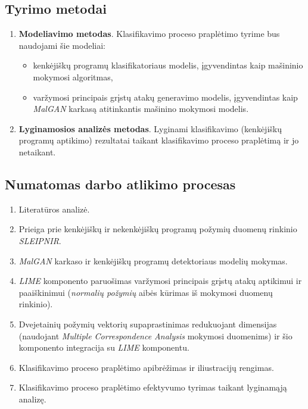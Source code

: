 \pagebreak
\subsection{Tyrimo metodai}

\begin{enumerate}
    \item \textbf{Modeliavimo metodas}. Klasifikavimo proceso praplėtimo tyrime bus naudojami šie modeliai:
    \begin{itemize}
        \item kenkėjiškų programų klasifikatoriaus modelis, įgyvendintas kaip mašininio mokymosi algoritmas,
        \item varžymosi principais grįstų atakų generavimo modelis, įgyvendintas kaip \textit{MalGAN} karkasą atitinkantis mašinino mokymosi modelis.
    \end{itemize}
    \item \textbf{Lyginamosios analizės metodas}. Lyginami klasifikavimo (kenkėjiškų programų aptikimo) rezultatai taikant klasifikavimo proceso praplėtimą ir jo netaikant.
\end{enumerate}

\subsection{Numatomas darbo atlikimo procesas}

\begin{enumerate}
    \item Literatūros analizė.
    \item Prieiga prie kenkėjiškų ir nekenkėjiškų programų požymių duomenų rinkinio \textit{SLEIPNIR}.
    \item \textit{MalGAN} karkaso ir kenkėjiškų programų detektoriaus modelių mokymas.
    \item \textit{LIME} komponento paruošimas varžymosi principais grįstų atakų aptikimui ir paaiškinimui (\textit{normalių požymių} aibės kūrimas iš mokymosi duomenų rinkinio).
    \item Dvejetainių požymių vektorių supaprastinimas redukuojant dimensijas (naudojant \textit{Multiple Correspondence Analysis} mokymosi duomenims) ir šio komponento integracija su \textit{LIME} komponentu.
    \item Klasifikavimo proceso praplėtimo apibrėžimas ir iliustracijų rengimas.
    \item Klasifikavimo proceso praplėtimo efektyvumo tyrimas taikant lyginamąją analizę.
\end{enumerate}